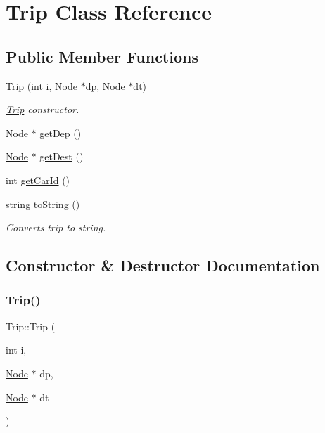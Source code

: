 \hypertarget{class_trip}{}\section{Trip Class Reference}
\label{class_trip}
\subsection*{Public Member Functions}
\begin{DoxyCompactItemize}
\item 
\mbox{\hyperlink{class_trip_a2f3f0d00dcf9d34731f9b2adea7a9955}{Trip}} (int i, \mbox{\hyperlink{class_node}{Node}} $\ast$dp, \mbox{\hyperlink{class_node}{Node}} $\ast$dt)
\begin{DoxyCompactList}\small\item\em \mbox{\hyperlink{class_trip}{Trip}} constructor. \end{DoxyCompactList}\item 
\mbox{\hyperlink{class_node}{Node}} $\ast$ \mbox{\hyperlink{class_trip_abed9f3fae8783dfa6ab2da3f4ea30ea6}{get\+Dep}} ()
\item 
\mbox{\hyperlink{class_node}{Node}} $\ast$ \mbox{\hyperlink{class_trip_afd7e6fed20745d94e590ca40350aa00a}{get\+Dest}} ()
\item 
int \mbox{\hyperlink{class_trip_af1de0c30957c1506f30cb3aab6b60248}{get\+Car\+Id}} ()
\item 
string \mbox{\hyperlink{class_trip_a8394f34452552c84d48c755279a65662}{to\+String}} ()
\begin{DoxyCompactList}\small\item\em Converts trip to string. \end{DoxyCompactList}\end{DoxyCompactItemize}


\subsection{Constructor \& Destructor Documentation}
\mbox{\label{class_trip_a2f3f0d00dcf9d34731f9b2adea7a9955}} 
\subsubsection{\texorpdfstring{Trip()}{Trip()}}
{\footnotesize\ttfamily Trip\+::\+Trip (\begin{DoxyParamCaption}\item[{int}]{i,  }\item[{\mbox{\hyperlink{class_node}{Node}} $\ast$}]{dp,  }\item[{\mbox{\hyperlink{class_node}{Node}} $\ast$}]{dt }\end{DoxyParamCaption})}



